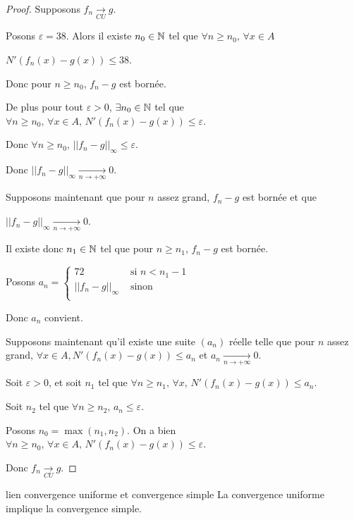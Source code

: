 \begin{proof}
    Supposons $f_n \xrightarrow[CU]{} g$.

    Posons $\varepsilon = 38$. Alors il existe $n_0 \in \mathbb{N}$ tel que $\forall n \geqslant n_0, \, \forall x \in A$ 
    
    $N'(f_n(x) - g(x)) \leqslant 38$.

    Donc pour $n \geqslant n_0$, $f_n - g$ est bornée.

    De plus pour tout $\varepsilon >0$, $\exists n_0 \in \mathbb{N}$ tel que $\forall n \geqslant n_0, \, \forall x \in A, \, N'(f_n(x) - g(x)) \leqslant \varepsilon$.

    Donc $\forall n \geqslant n_0, \, || f_n - g ||_{\infty} \leqslant \varepsilon$.

    Donc $\displaystyle || f_n - g ||_{\infty} \xrightarrow[n\to +\infty]{} 0$.

    \lvspace Supposons maintenant que pour $n$ assez grand, $f_n - g$ est bornée et que 
    
    $\displaystyle || f_n - g ||_{\infty} \xrightarrow[n\to +\infty]{} 0$.

    Il existe donc $n_1 \in \mathbb{N}$ tel que pour $n \geqslant n_1$, $f_n - g$ est bornée. 
    
    Posons 
    $a_n = \left\{ \begin{array}{cc}
        72 & \text{ si } n < n_1  - 1\\
        || f_n - g ||_{\infty} & \text{ sinon }\\
    \end{array} \right. $

    Donc $a_n$ convient. 

    \lvspace Supposons maintenant qu'il existe une suite $(a_n)$ réelle telle que pour $n$ assez grand, 
    $\forall x \in A, N'(f_n(x) - g(x)) \leqslant a_n$ et $a_n \xrightarrow[n\to +\infty]{} 0$.

    Soit $\varepsilon > 0$, et soit $n_1$ tel que $\forall n \geqslant n_1, \, \forall x, \, N'(f_n(x) - g(x)) \leqslant a_n$.

    Soit $n_2$ tel que $\forall n \geqslant n_2, \, a_n \leqslant \varepsilon$.

    Posons $n_0 = \max(n_1, n_2)$. On a bien $\forall n \geqslant n_0, \, \forall x \in A, \, N'(f_n(x) - g(x)) \leqslant \varepsilon$.

    Donc $f_n \xrightarrow[CU]{} g$.
\end{proof}

\begin{proposition}{lien convergence uniforme et convergence simple}{}
    La convergence uniforme implique la convergence simple.
\end{proposition}

